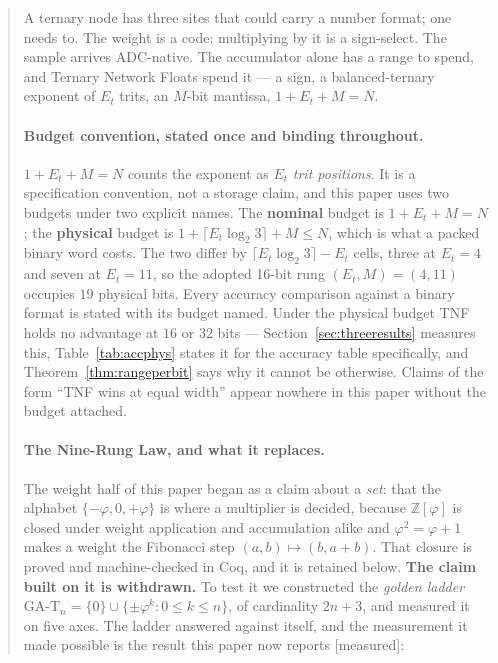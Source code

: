 
\begin{abstract}
A ternary node has three sites that could carry a number format; one needs to.
The weight is a code: multiplying by it is a sign-select. The sample arrives
ADC-native. The accumulator alone has a range to spend, and Ternary Network
Floats spend it --- a sign, a balanced-ternary exponent of $E_t$ trits, an
$M$-bit mantissa, $1+E_t+M=N$.

\paragraph{Budget convention, stated once and binding throughout.}\label{sec:budget}
$1+E_t+M=N$ counts the exponent as $E_t$ \emph{trit positions}. It is a
specification convention, not a storage claim, and this paper uses two budgets
under two explicit names. The \textbf{nominal} budget is $1+E_t+M=N$; the
\textbf{physical} budget is $1+\lceil E_t\log_2 3\rceil+M \le N$, which is what a
packed binary word costs. The two differ by
$\lceil E_t\log_2 3\rceil - E_t$ cells, three at $E_t=4$ and seven at $E_t=11$, so
the adopted 16-bit rung $(E_t,M)=(4,11)$ occupies $19$ physical bits. Every
accuracy comparison against a binary format is stated with its budget named. Under
the physical budget TNF holds no advantage at $16$ or $32$ bits ---
Section~\ref{sec:threeresults} measures this, Table~\ref{tab:accphys} states it
for the accuracy table specifically, and Theorem~\ref{thm:rangeperbit} says why it
cannot be otherwise. Claims of the form ``TNF wins at equal width'' appear nowhere
in this paper without the budget attached.

\paragraph{The Nine-Rung Law, and what it replaces.}\label{sec:ninerung}
The weight half of this paper began as a claim about a \emph{set}: that the
alphabet $\{-\varphi,0,+\varphi\}$ is where a multiplier is decided, because
$\mathbb{Z}[\varphi]$ is closed under weight application and accumulation alike
and $\varphi^2=\varphi+1$ makes a weight the Fibonacci step
$(a,b)\mapsto(b,a+b)$. That closure is proved and machine-checked in Coq, and it
is retained below. \textbf{The claim built on it is withdrawn.} To test it we
constructed the \emph{golden ladder}
$\mathrm{GA\text{-}T}_n=\{0\}\cup\{\pm\varphi^k: 0\le k\le n\}$, of cardinality
$2n{+}3$, and measured it on five axes. The ladder answered against itself, and
the measurement it made possible is the result this paper now reports
\textup{[measured]}:


\end{abstract}
